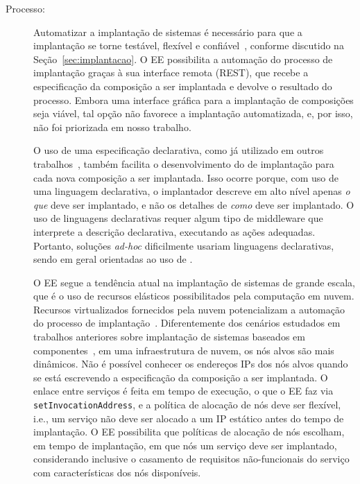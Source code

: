 \begin{description}

\item [Processo:]

Automatizar a implantação de sistemas 
é necessário para que a implantação se torne testável, flexível e confiável~\cite{Hamilton2007InternetScale},
conforme discutido na Seção~\ref{sec:implantacao}.
O EE possibilita a automação do processo de implantação
graças à sua interface remota (REST), que recebe a especificação
da composição a ser implantada e devolve o resultado do processo.
Embora uma interface gráfica para a implantação de composições seja viável,
tal opção não favorece a implantação automatizada,
e, por isso, não foi priorizada em nosso trabalho.

O uso de uma especificação declarativa,
como já utilizado em outros trabalhos~\cite{Balter1998Olan,Magee1996Dynamic},
também facilita o desenvolvimento do \script de implantação
para cada nova composição a ser implantada.
Isso ocorre porque, com uso de uma linguagem declarativa, o implantador descreve em alto nível apenas
\emph{o que} deve ser implantado, e não os detalhes de \emph{como} deve ser implantado.
O uso de linguagens declarativas requer algum tipo de middleware que interprete
a descrição declarativa, executando as ações adequadas.
Portanto, soluções \emph{ad-hoc} dificilmente usariam linguagens declarativas,
sendo em geral orientadas ao uso de \scripts.

O EE segue a tendência atual na implantação de sistemas de grande escala, que é o uso
de recursos elásticos possibilitados pela computação em nuvem.
Recursos virtualizados fornecidos pela nuvem potencializam
a automação do processo de implantação~\cite{Humble2011Continuous}.
Diferentemente dos cenários estudados em trabalhos anteriores sobre
implantação de sistemas baseados em componentes~\cite{Balter1998Olan,Magee1996Dynamic},
em uma infraestrutura de nuvem, os nós alvos são mais dinâmicos. 
Não é possível conhecer os endereços IPs
dos nós alvos quando se está escrevendo a especificação da composição a ser implantada.
O enlace entre serviços é feita em tempo de execução, o que o EE faz via \texttt{setInvocationAddress},
e a política de alocação de nós deve ser flexível, i.e.,
um serviço não deve ser alocado a um IP estático antes do tempo de implantação.
O EE possibilita que políticas de alocação de nós
escolham, em tempo de implantação, em que nós um serviço deve ser implantado,
considerando inclusive o casamento de requisitos não-funcionais do serviço
com características dos nós disponíveis.


\end{description}
